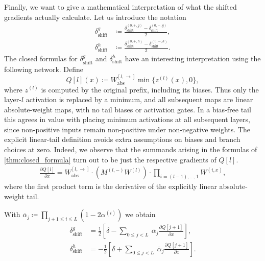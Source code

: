 Finally, we want to give a mathematical interpretation of what the shifted gradients actually calculate. Let us introduce the notation
\begin{align}
    \delta_{\text{shift}}^g
        &\coloneqq \frac{\delta_{\text{shift}}^{(0, +, g)} -\delta_{\text{shift}}^{(0, -, g)}}{2}, \label{eq:stable_def_pos}\\
    \delta_{\text{shift}}^h
        &\coloneqq \frac{\delta_{\text{shift}}^{(0, +, h)} -\delta_{\text{shift}}^{(0, -, h)}}{2}\label{eq:stable_def_neg}.
\end{align}
The closed formulas for $\delta_{\text{shift}}^g$ and $\delta_{\text{shift}}^h$ have an interesting interpretation using the following network.
Define
\[
    Q[l](x) \coloneqq W_{\text{abs}}^{[l,\rightarrow]}
        \min\{z^{(l)}(x),0\},
\]
where $z^{(l)}$ is computed by the original prefix, including its biases.
Thus only the layer-$l$ activation is replaced by a minimum, and all subsequent
maps are linear absolute-weight maps, with no tail biases or activation gates.
In a bias-free tail this agrees in value with placing minimum activations at
all subsequent layers, since non-positive inputs remain non-positive under
non-negative weights. The explicit linear-tail definition avoids extra
assumptions on biases and branch choices at zero.
Indeed, we observe that the summands arising in the formulas of \cref{thm:closed_formula} turn out to be just the respective gradients of $Q[l]$.
\begin{align}
    \frac{\partial Q[l]}{\partial x}
        = W_{\text{abs}}^{[l, \rightarrow]} \cdot \left( M^{(l,-)}W^{(l)} \right) \cdot \prod_{i = (l-1),\dots,1} W^{(i,x)} \label{eq:special_network_derivative},
\end{align}
where the first product term is the derivative of the explicitly linear absolute-weight tail.

\begin{theorem} \label{thm:closed_formula_shift}
    With $\overline{\alpha}_j \coloneqq \prod_{j+1 \leq i \leq L} \left( 1 - 2 \alpha^{(i)} \right)$ we obtain
    \begin{align}
        \delta_{\text{shift}}^g &= \frac{1}{2} \left[ \delta - \sum_{0 \leq j < L} \ \overline{\alpha}_j \frac{\partial Q[j+1]}{\partial x} \right], \label{eq:main_shifted_grad_pos}\\
        \delta_{\text{shift}}^h &= - \frac{1}{2} \left[ \delta + \sum_{0 \leq j < L} \ \overline{\alpha}_j  \frac{\partial Q[j+1]}{\partial x} \right]. \label{eq:main_shifted_grad_neg}
    \end{align}
\end{theorem}

